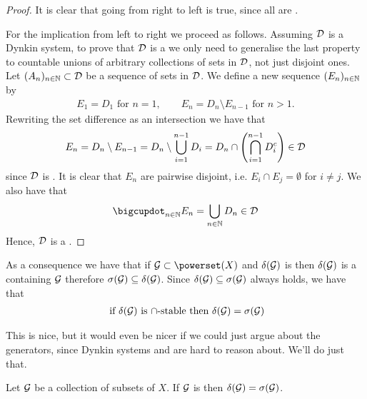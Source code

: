 \begin{proof}
	It is clear that going from right to left is true, since all \sigas are \istable.
	
	For the implication from left to right we proceed as follows. Assuming $\mathcal{D}$ is a \istable Dynkin system, to prove that $\mathcal{D}$ is a \siga we only need to generalise the last property to countable unions of arbitrary collections of sets in $\mathcal{D}$, not just disjoint ones. Let $(A_n)_{n\in\mathbb{N}} \subset \mathcal{D}$ be a sequence of sets in $\mathcal{D}$. We define a new sequence $(E_n)_{n\in\mathbb{N}}$ by
	\begin{align*}
	E_1 = D_1 \text{ for } n = 1,\qquad E_n = D_n \setminus E_{n-1} \text{ for } n > 1.
	\end{align*}
	Rewriting the set difference as an intersection we have that
	\begin{align*}
	E_n = D_n \setminus E_{n-1} = D_n \setminus \bigcup_{i=1}^{n-1}D_i = D_n \cap \left(\bigcap_{i=1}^{n-1} D_i^c\right) \in \mathcal{D}
	\end{align*}
	since $\mathcal{D}$ is \istable.
	It is clear that $E_n$ are pairwise disjoint, i.e. $E_i \cap E_j = \emptyset$ for $i \neq j$. We also have that
	\begin{align*}
	\bigcupdot_{n \in \N} E_n = \bigcup_{n \in \N} D_n \in \calD
	\end{align*}
	Hence, $\mathcal{D}$ is a \siga.
\end{proof}

\begin{remark}
	As a consequence we have that if $\calG \subset \powerset(X)$ and $\delta(\mathcal{G})$ is \istable then $\delta(\mathcal{G})$ is a \siga containing $\mathcal{G}$ therefore $\sigma(\mathcal{G}) \subseteq \delta(\mathcal{G})$. Since $\delta(\mathcal{G}) \subseteq \sigma(\mathcal{G})$ always holds, we have that
	\begin{align*}
	\text{ if } \delta(\mathcal{G}) \text{ is $\cap$-stable then } \delta(\mathcal{G}) = \sigma(\mathcal{G})
	\end{align*}
\end{remark}

This is nice, but it would even be nicer if we could just argue about the generators, since Dynkin systems and \sigas are hard to reason about. We'll do just that.

\begin{thm}
	Let $\mathcal{G}$ be a collection of subsets of $X$. If $\mathcal{G}$ is \istable then $\delta(\mathcal{G}) = \sigma(\mathcal{G})$.
\end{thm}

